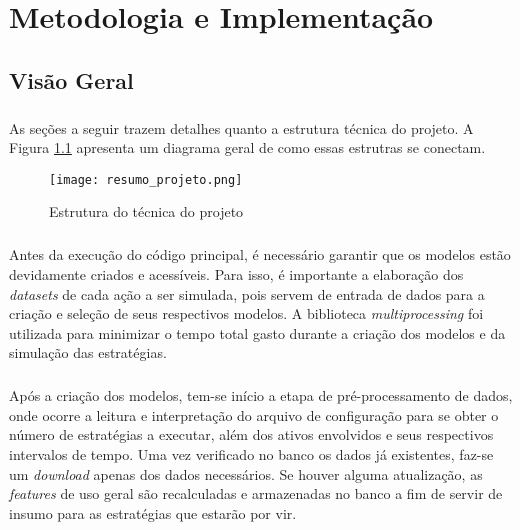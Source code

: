 \chapter{Metodologia e Implementação}
\label{cap3}



\FloatBarrier
\section{Visão Geral}

\paragraph{} As seções a seguir trazem detalhes quanto a estrutura técnica do projeto. A Figura \ref{fig:100} apresenta um diagrama geral de como essas estrutras se conectam.

\begin{figure}[!htb]
    \texttt{[image: resumo\_projeto.png]}
    \centering
    \caption{Estrutura do técnica do projeto}
    \label{fig:100}
\end{figure}

\paragraph{} Antes da execução do código principal, é necessário garantir que os modelos estão devidamente criados e acessíveis. Para isso, é importante a elaboração dos \textit{datasets} de cada ação a ser simulada, pois servem de entrada de dados para a criação e seleção de seus respectivos modelos. A biblioteca \textit{multiprocessing} foi utilizada para minimizar o tempo total gasto durante a criação dos modelos e da simulação das estratégias.

\paragraph{} Após a criação dos modelos, tem-se início a etapa de pré-processamento de dados, onde ocorre a leitura e interpretação do arquivo de configuração para se obter o número de estratégias a executar, além dos ativos envolvidos e seus respectivos intervalos de tempo. Uma vez verificado no banco os dados já existentes, faz-se um \textit{download} apenas dos dados necessários. Se houver alguma atualização, as \textit{features} de uso geral são recalculadas e armazenadas no banco a fim de servir de insumo para as estratégias que estarão por vir.

